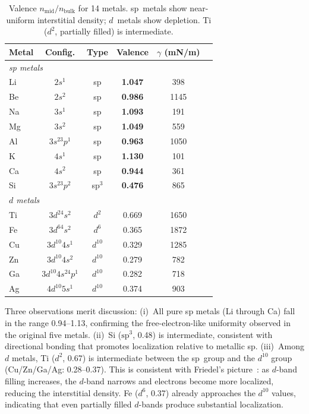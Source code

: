\documentclass[twocolumn,showpacs,preprintnumbers,amsmath,amssymb,prb]{revtex4-2}
\begin{document}
\begin{table}[htb]
  \centering
  \caption{Valence $n_\mathrm{mid}/n_\mathrm{bulk}$ for 14 metals.
    sp~metals show near-uniform interstitial density;
    $d$~metals show depletion.
    Ti ($d^2$, partially filled) is intermediate.}
  \label{tab:14metals}
  \begin{ruledtabular}
  \begin{tabular}{lccccc}
    Metal & Config. & Type & Valence & $\gamma$ (mN/m) \\
    \hline
    \multicolumn{5}{l}{\emph{sp metals}} \\
    Li  & $2s^1$         & sp    & \textbf{1.047} &  398 \\
    Be  & $2s^2$         & sp    & \textbf{0.986} & 1145 \\
    Na  & $3s^1$         & sp    & \textbf{1.093} &  191 \\
    Mg  & $3s^2$         & sp    & \textbf{1.049} &  559 \\
    Al  & $3s^23p^1$     & sp    & \textbf{0.963} & 1050 \\
    K   & $4s^1$         & sp    & \textbf{1.130} &  101 \\
    Ca  & $4s^2$         & sp    & \textbf{0.944} &  361 \\
    Si  & $3s^23p^2$     & sp$^3$ & \textbf{0.476} &  865 \\
    \hline
    \multicolumn{5}{l}{\emph{$d$ metals}} \\
    Ti  & $3d^24s^2$     & $d^2$  & 0.669 & 1650 \\
    Fe  & $3d^64s^2$     & $d^6$  & 0.365 & 1872 \\
    Cu  & $3d^{10}4s^1$  & $d^{10}$ & 0.329 & 1285 \\
    Zn  & $3d^{10}4s^2$  & $d^{10}$ & 0.279 &  782 \\
    Ga  & $3d^{10}4s^24p^1$ & $d^{10}$ & 0.282 &  718 \\
    Ag  & $4d^{10}5s^1$  & $d^{10}$ & 0.374 &  903 \\
  \end{tabular}
  \end{ruledtabular}
\end{table}

Three observations merit discussion:
(i)~All pure sp metals (Li through Ca) fall in the range 0.94--1.13,
confirming the free-electron-like uniformity observed in the
original five metals.
(ii)~Si ($\mathrm{sp}^3$, 0.48) is intermediate, consistent with
directional bonding that promotes localization relative to metallic sp.
(iii)~Among $d$ metals, Ti ($d^2$, 0.67) is intermediate between
the sp~group and the $d^{10}$ group (Cu/Zn/Ga/Ag: 0.28--0.37).
This is consistent with Friedel's picture~\cite{Friedel1969}:
as $d$-band filling increases, the $d$-band narrows and electrons
become more localized, reducing the interstitial density.
Fe ($d^6$, 0.37) already approaches the $d^{10}$ values,
indicating that even partially filled $d$-bands produce
substantial localization.
\end{document}
